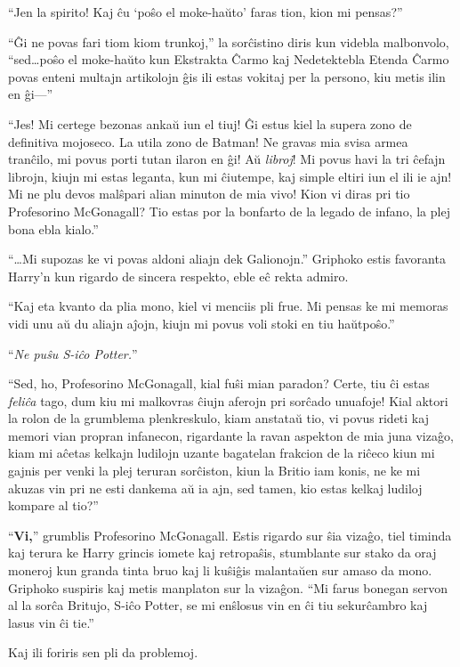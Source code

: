``Jen la spirito! Kaj ĉu `poŝo el moke-haŭto' faras tion, kion mi pensas?''

``Ĝi ne povas fari tiom kiom trunkoj,'' la sorĉistino diris kun
videbla malbonvolo, ``sed\ldots poŝo el moke-haŭto kun Ekstrakta
Ĉarmo kaj Nedetektebla Etenda Ĉarmo povas enteni multajn artikolojn
ĝis ili estas vokitaj per la persono, kiu metis ilin en ĝi—''

``Jes! Mi certege bezonas ankaŭ iun el tiuj! Ĝi estus kiel la supera zono de
definitiva mojoseco. La utila zono de Batman! Ne gravas mia svisa armea
tranĉilo, mi povus porti tutan ilaron en ĝi! Aŭ \emph{libroj}! Mi povus havi la
tri ĉefajn librojn, kiujn mi estas leganta, kun mi ĉiutempe, kaj simple eltiri
iun el ili ie ajn! Mi ne plu devos malŝpari alian minuton de mia vivo! Kion vi
diras pri tio Profesorino McGonagall? Tio estas por la bonfarto de la legado de
infano, la plej bona ebla kialo.''

``\ldots Mi supozas ke vi povas aldoni aliajn dek Galionojn.''
Griphoko estis favoranta Harry'n kun rigardo de sincera respekto, eble
eĉ rekta admiro.

``Kaj eta kvanto da plia mono, kiel vi menciis pli frue. Mi pensas ke
mi memoras vidi unu aŭ du aliajn aĵojn, kiujn mi povus voli stoki en
tiu haŭtpoŝo.''

``\emph{Ne puŝu S-iĉo Potter.}''

``Sed, ho, Profesorino McGonagall, kial fuŝi mian paradon? Certe, tiu
ĉi estas \emph{feliĉa} tago, dum kiu mi malkovras ĉiujn aferojn pri
sorĉado unuafoje! Kial aktori la rolon de la grumblema plenkreskulo,
kiam anstataŭ tio, vi povus rideti kaj memori vian propran infanecon,
rigardante la ravan aspekton de mia juna vizaĝo, kiam mi aĉetas
kelkajn ludilojn uzante bagatelan frakcion de la riĉeco kiun mi gajnis
per venki la plej teruran sorĉiston, kiun la Britio iam konis, ne ke
mi akuzas vin pri ne esti dankema aŭ ia ajn, sed tamen, kio estas
kelkaj ludiloj kompare al tio?''

``\textbf{Vi,}'' grumblis Profesorino McGonagall. Estis rigardo sur
ŝia vizaĝo, tiel timinda kaj terura ke Harry grincis iomete kaj retropaŝis,
stumblante sur stako da oraj moneroj kun granda tinta bruo kaj li kuŝiĝis
malantaŭen sur amaso da mono. Griphoko suspiris kaj metis manplaton
sur la vizaĝon. ``Mi farus bonegan servon al la sorĉa Britujo, S-iĉo
Potter, se mi enŝlosus vin en ĉi tiu sekurĉambro kaj lasus vin ĉi
tie.''

Kaj ili foriris sen pli da problemoj.

